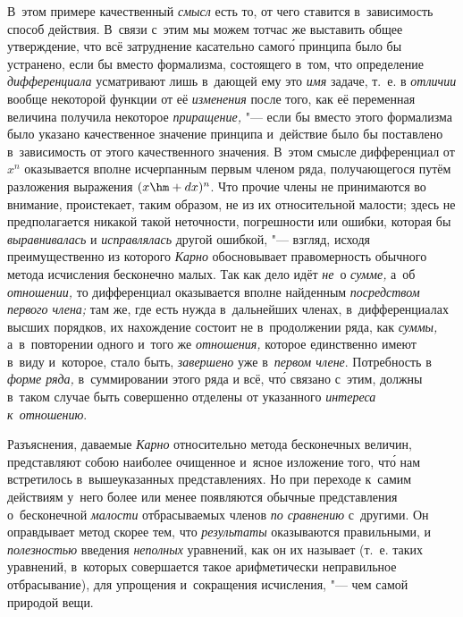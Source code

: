 В~этом примере качественный {\em смысл} есть то, от чего ставится в~зависимость способ
действия. В~связи с~этим мы можем тотчас же выставить общее утверждение, что всё
затруднение касательно самог\'{о} принципа было бы устранено, если бы вместо
формализма, состоящего в~том, что определение {\em дифференциала} усматривают
лишь в~дающей ему это {\em имя} задаче, т.~е. в {\em отличии} вообще некоторой
функции от её {\em изменения} после того, как её переменная величина получила
некоторое {\em приращение,} "--- если бы вместо этого формализма было указано
качественное значение принципа и~действие было бы поставлено в~зависимость от
этого качественного значения. В~этом смысле дифференциал от $x^n$ оказывается
вполне исчерпанным первым членом ряда, получающегося путём разложения выражения
$(x\hm+dx)^n$. Что прочие члены не принимаются во внимание, проистекает, таким
образом, не из их относительной малости; здесь не предполагается никакой такой
неточности, погрешности или ошибки, которая бы {\em выравнивалась} и
{\em исправлялась} другой ошибкой, "--- взгляд, исходя преимущественно из
которого {\em Карно} обосновывает правомерность обычного метода исчисления бесконечно малых.
Так как дело идёт {\em не}~о {\em сумме,} а~об {\em отношении,}
то дифференциал оказывается вполне найденным {\em посредством первого члена;}
там же, где есть нужда в~дальнейших членах, в~дифференциалах
высших порядков, их нахождение состоит не в~продолжении ряда, как {\em суммы,}
а~в~повторении одного и~того же {\em отношения,} которое единственно имеют
в~виду и~которое, стало быть, {\em завершено} уже в~{\em первом члене}.
Потребность в {\em форме ряда,} в~суммировании этого ряда и
всё, чт\'{о} связано с~этим, должны в~таком случае быть совершенно отделены от
указанного {\em интереса к~отношению}.

Разъяснения, даваемые {\em Карно} относительно метода бесконечных величин,
представляют собою наиболее очищенное и~ясное изложение того, чт\'{о} нам
встретилось в~вышеуказанных представлениях. Но при переходе к~самим действиям
у~него более или менее появляются обычные представления о~бесконечной
{\em малости} отбрасываемых членов {\em по сравнению} с~другими. Он
оправдывает метод скорее тем, что {\em результаты} оказываются правильными,
и {\em полезностью} введения {\em неполных} уравнений, как он их называет
(т.~е. таких уравнений, в~которых совершается такое арифметически неправильное
отбрасывание), для упрощения и~сокращения исчисления, "--- чем самой
природой вещи.

